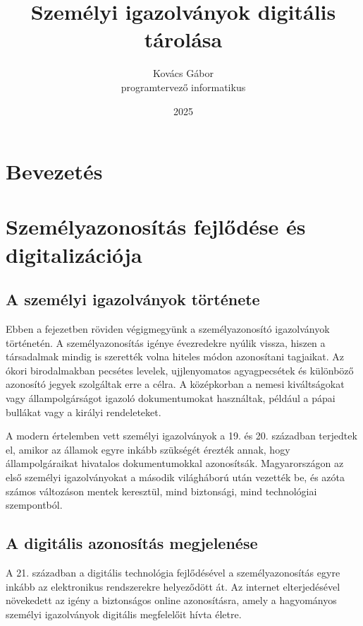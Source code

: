 \documentclass[
]{thesis-ekf}
\theoremstyle{definition}
\theoremstyle{remark}
\begin{document}
	
	\title{Személyi igazolványok digitális tárolása}
	\author{Kovács Gábor\\programtervező informatikus}
	\date{2025}
	\maketitle
	
	\tableofcontents
	
	\chapter*{Bevezetés}
	
	\chapter{Személyazonosítás fejlődése és digitalizációja}
	
	\section{A személyi igazolványok története}
	
	Ebben a fejezetben röviden végigmegyünk a személyazonosító igazolványok történetén. A személyazonosítás igénye évezredekre nyúlik vissza, hiszen a társadalmak mindig is szerették volna hiteles módon azonosítani tagjaikat. Az ókori birodalmakban pecsétes levelek, ujjlenyomatos agyagpecsétek és különböző azonosító jegyek szolgáltak erre a célra.  A középkorban a nemesi kiváltságokat vagy állampolgárságot igazoló dokumentumokat használtak, például a pápai bullákat vagy a királyi rendeleteket. \cite{okoriAzonositas, kozepkorAzonositas}
	
	A modern értelemben vett személyi igazolványok a 19. és 20. században terjedtek el, amikor az államok egyre inkább szükségét érezték annak, hogy állampolgáraikat hivatalos dokumentumokkal azonosítsák. Magyarországon az első személyi igazolványokat a második világháború után vezették be, és azóta számos változáson mentek keresztül, mind biztonsági, mind technológiai szempontból. \cite{magyarAzonositas}
	
	\section{A digitális azonosítás megjelenése}
	A 21. században a digitális technológia fejlődésével a személyazonosítás egyre inkább az elektronikus rendszerekre helyeződött át. Az internet elterjedésével növekedett az igény a biztonságos online azonosításra, amely a hagyományos személyi igazolványok digitális megfelelőit hívta életre.
	
\end{document}
